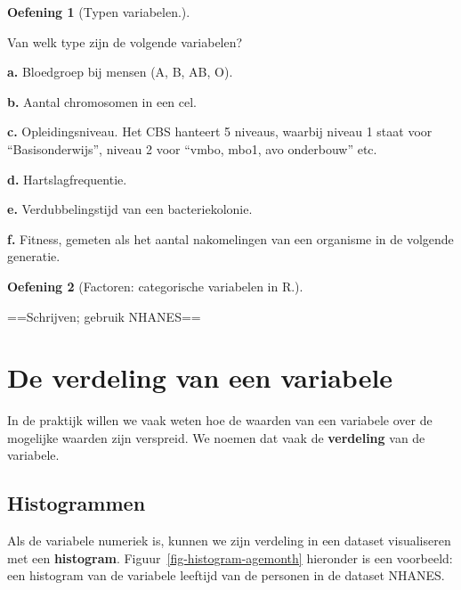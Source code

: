 \documentclass[
  a4paper,
]{scrbook}
\theoremstyle{definition}
\newtheorem{exercise}{Oefening}[chapter]
\theoremstyle{definition}
\theoremstyle{remark}
\begin{document}
\begin{exercise}[Typen
variabelen.]\protect\hypertarget{exr-typen-vars}{}\label{exr-typen-vars}

Van welk type zijn de volgende variabelen?

\textbf{a.} Bloedgroep bij mensen (A, B, AB, O).

\textbf{b.} Aantal chromosomen in een cel.

\textbf{c.} Opleidingsniveau. Het CBS hanteert 5 niveaus, waarbij niveau
1 staat voor ``Basisonderwijs'', niveau 2 voor ``vmbo, mbo1, avo
onderbouw'' etc.

\textbf{d.} Hartslagfrequentie.

\textbf{e.} Verdubbelingstijd van een bacteriekolonie.

\textbf{f.} Fitness, gemeten als het aantal nakomelingen van een
organisme in de volgende generatie.

\end{exercise}

\begin{exercise}[Factoren: categorische variabelen in
R.]\protect\hypertarget{exr-factoren}{}\label{exr-factoren}

==Schrijven; gebruik NHANES==

\end{exercise}

\section{De verdeling van een
variabele}\label{de-verdeling-van-een-variabele}

In de praktijk willen we vaak weten hoe de waarden van een variabele
over de mogelijke waarden zijn verspreid. We noemen dat vaak de
\textbf{verdeling} van de variabele.

\subsection{Histogrammen}\label{histogrammen}

Als de variabele numeriek is, kunnen we zijn verdeling in een dataset
visualiseren met een \textbf{histogram}.
Figuur~\ref{fig-histogram-agemonth} hieronder is een voorbeeld: een
histogram van de variabele leeftijd van de personen in de dataset
NHANES.
\end{document}
